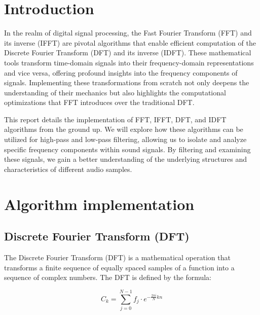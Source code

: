 \documentclass[a4paper,12pt,fleqn]{article}
\begin{document}

\tableofcontents
\newpage

\section{Introduction}
\hspace{1 em}In the realm of digital signal processing, the Fast Fourier Transform (FFT) and its inverse (IFFT) are pivotal algorithms that enable efficient computation of the Discrete Fourier Transform (DFT) and its inverse (IDFT). These mathematical tools transform time-domain signals into their frequency-domain representations and vice versa, offering profound insights into the frequency components of signals. Implementing these transformations from scratch not only deepens the understanding of their mechanics but also highlights the computational optimizations that FFT introduces over the traditional DFT.

This report details the implementation of FFT, IFFT, DFT, and IDFT algorithms from the ground up. We will explore how these algorithms can be utilized for high-pass and low-pass filtering, allowing us to isolate and analyze specific frequency components within sound signals. By filtering and examining these signals, we gain a better understanding of the underlying structures and characteristics of different audio samples.

\section{Algorithm implementation}

\subsection{Discrete Fourier Transform (DFT)}

\hspace{1 em}The Discrete Fourier Transform (DFT) is a mathematical operation that transforms a finite sequence of equally spaced samples of a function into a sequence of complex numbers. The DFT is defined by the formula:

\begin{equation}
    C_k = \sum_{j=0}^{N-1} f_j \cdot e^{-\frac{2\pi i}{N}kn}
\end{equation}
  
\end{document}
